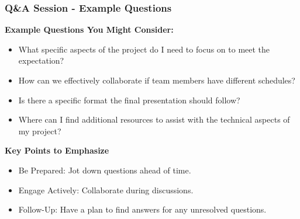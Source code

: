 \documentclass[aspectratio=169]{beamer}
\begin{document}
\begin{frame}[fragile]
    \frametitle{Q\&A Session - Example Questions}
    \textbf{Example Questions You Might Consider:}
    \begin{itemize}
        \item What specific aspects of the project do I need to focus on to meet the expectation?
        \item How can we effectively collaborate if team members have different schedules?
        \item Is there a specific format the final presentation should follow?
        \item Where can I find additional resources to assist with the technical aspects of my project?
    \end{itemize}

    \textbf{Key Points to Emphasize}
    \begin{itemize}
        \item Be Prepared: Jot down questions ahead of time.
        \item Engage Actively: Collaborate during discussions.
        \item Follow-Up: Have a plan to find answers for any unresolved questions.
    \end{itemize}
\end{frame}
\end{document}
